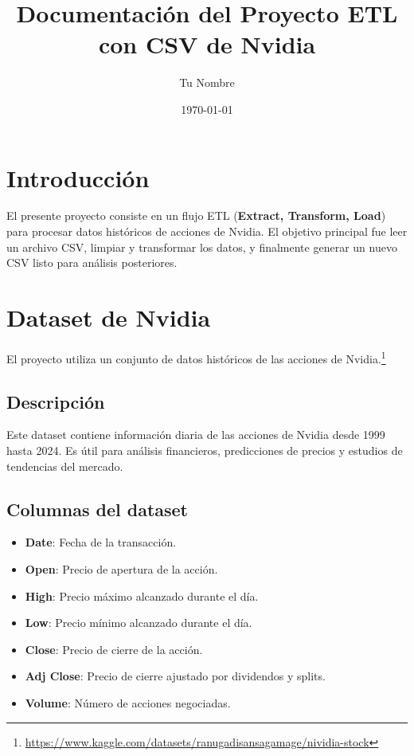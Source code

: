 \documentclass[12pt,a4paper]{article}
\title{Documentación del Proyecto ETL con CSV de Nvidia}
\author{Tu Nombre}
\date{\today}
\begin{document}
	
	\maketitle
	\tableofcontents
	\newpage
	
	\section{Introducción}
	El presente proyecto consiste en un flujo ETL (\textbf{Extract, Transform, Load}) para procesar datos históricos de acciones de Nvidia. El objetivo principal fue leer un archivo CSV, limpiar y transformar los datos, y finalmente generar un nuevo CSV listo para análisis posteriores.
	
	\section{Dataset de Nvidia}
	El proyecto utiliza un conjunto de datos históricos de las acciones de Nvidia.\footnote{\url{https://www.kaggle.com/datasets/ranugadisansagamage/nividia-stock}}
	
	\subsection{Descripción}
	Este dataset contiene información diaria de las acciones de Nvidia desde 1999 hasta 2024. Es útil para análisis financieros, predicciones de precios y estudios de tendencias del mercado.
	
	\subsection{Columnas del dataset}
	\begin{itemize}
		\item \textbf{Date}: Fecha de la transacción.
		\item \textbf{Open}: Precio de apertura de la acción.
		\item \textbf{High}: Precio máximo alcanzado durante el día.
		\item \textbf{Low}: Precio mínimo alcanzado durante el día.
		\item \textbf{Close}: Precio de cierre de la acción.
		\item \textbf{Adj Close}: Precio de cierre ajustado por dividendos y splits.
		\item \textbf{Volume}: Número de acciones negociadas.
	\end{itemize}
	
\end{document}
